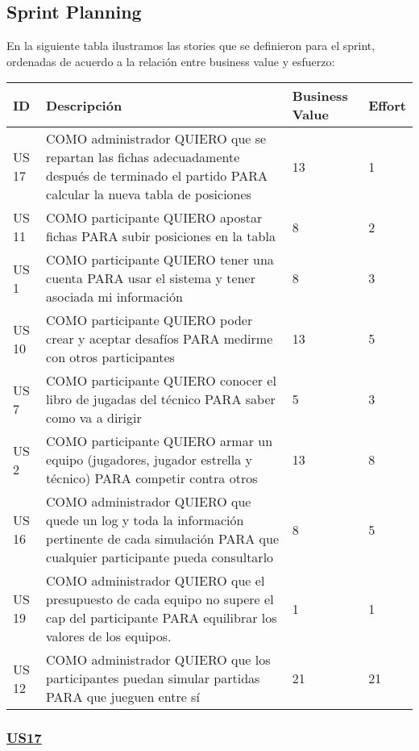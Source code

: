 \subsection{Sprint Planning}

\indent En la siguiente tabla ilustramos las stories que se definieron para el sprint, ordenadas de acuerdo a la relación entre business value y esfuerzo:\\

\begin{center}
  \begin{tabular}{| l | p{10cm} | l | l | }
    \hline
ID & Descripción & Business Value & Effort\\  \hline
US 17 & COMO administrador QUIERO que se repartan las fichas adecuadamente después de terminado el partido PARA calcular la nueva tabla de posiciones & 13 & 1\\  \hline
US 11 & COMO participante QUIERO apostar fichas PARA subir posiciones en la tabla & 8 & 2\\  \hline
US 1 & COMO participante QUIERO tener una cuenta PARA usar el sistema y tener asociada mi información & 8 & 3\\  \hline
US 10 & COMO participante QUIERO poder crear y aceptar desafíos PARA medirme con otros participantes & 13 & 5\\  \hline
US 7 & COMO participante QUIERO conocer el libro de jugadas del técnico PARA saber como va a dirigir & 5 & 3\\  \hline
US 2 & COMO participante QUIERO armar un equipo (jugadores, jugador estrella y técnico) PARA competir contra otros & 13 & 8\\  \hline
US 16 & COMO administrador QUIERO que quede un log y toda la información pertinente de cada simulación PARA que cualquier participante pueda consultarlo & 8 & 5\\  \hline
US 19 & COMO administrador QUIERO que el presupuesto de cada equipo no supere el cap del participante PARA equilibrar los valores de los equipos. & 1 & 1\\  \hline
US 12 & COMO administrador QUIERO que los participantes puedan simular partidas PARA que jueguen entre sí & 21 & 21\\  \hline
  \end{tabular}
\end{center}


\subsubsection*{\underline{US17}}

